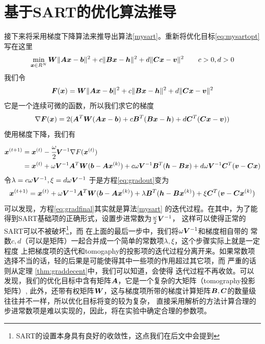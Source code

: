 \section{基于SART的优化算法推导}
接下来将采用梯度下降算法来推导出算法\ref{mysart}。重新将优化目标\ref{eq:mysartopt}写在这里
\begin{equation}
\min_{\bm{ x}\in R^N}\bm{W}\lVert\bm{A}\bm{ x}-\bm{b}\rVert^2 +c\lVert\bm{B}\bm{ x}-\bm{h}\rVert^2+d\lVert\bm{C}\bm{ x}-\bm{v}\rVert^2 \qquad c>0,d>0
\end{equation}
我们令
\begin{equation*}
\bm{F}(\bm{ x}) = \bm{W}\lVert\bm{A}\bm{ x}-\bm{b}\rVert^2 +c\lVert\bm{B}\bm{ x}-\bm{h}\rVert^2+d\lVert\bm{C}\bm{ x}-\bm{v}\rVert^2
\end{equation*}
它是一个连续可微的函数，所以我们求它的梯度
\begin{equation*}
\nabla \bm{F}(\bm{ x}) = 2(\bm{A}^T\bm{W}(\bm{A}\bm{ x}-\bm{b})+c\bm{B}^T(\bm{B}\bm{ x}-\bm{h})+d\bm{C}^T(\bm{C}\bm{ x}-\bm{v}))
\end{equation*}
使用梯度下降，我们有
\begin{equation}\label{eq:gradout}
\begin{split}
\bm{ x}^{(t+1)}&=\bm{ x}^{(t)}-\cfrac{\omega}{2}\bm{V}^{-1}\nabla F(\bm{ x}^{(t)})\\
&=\bm{ x}^{(t)} + \omega\bm{V}^{-1}\bm{A}^T\bm{W}(\bm{b}-\bm{A}\bm{ x}^{(k)})
           + c\omega\bm{V}^{-1}\bm{B}^T(\bm{h}-\bm{B}\bm{ x})
           + d\omega\bm{V}^{-1}\bm{C}^T(\bm{v}-\bm{C}\bm{ x})
\end{split}
\end{equation}\label{eq:gradfinal}
令$\lambda = c\omega\bm{V}^{-1},\xi = d\omega\bm{V}^{-1}$
于是方程\eqref{eq:gradout}变为
\begin{equation}\label{eq:gradout2}
\bm{ x}^{(t+1)}= \bm{ x}^{(t)} + \omega\bm{V}^{-1}\bm{A}^T\bm{W}(\bm{b}-\bm{A}\bm{ x}^{(k)})
           + \lambda \bm{B}^T(\bm{h}-\bm{B}\bm{ x}^{(k)})
           + \xi \bm{C}^T(\bm{v}-\bm{C}\bm{ x}^{(k)})
\end{equation}
可以发现，方程\eqref{eq:gradfinal}其实就是算法\ref{mysart}
的迭代过程。在其中，为了能得到SART基础项的正确形式，设置步进常数为$\tfrac{\omega}{2}\bm{V}^{-1}$，
这样可以使得正常的SART可以不被破坏\footnote{SART的设置本身具有良好的收敛性，这点我们在后文中会提到}，而
在上面的最后一步中，我们将$\omega\bm{V}^{-1}$和梯度相自带的
常数$c,d$（可以是矩阵）一起合并成一个简单的常数项$\lambda ,\xi$，这个步骤实际上就是一定程度
上把梯度项的迭代和tomogaphy的投影项的迭代过程分离开来。如果常数项选择不当的话，轻的后果是可能使得其中一些项的作用超过其它项，而
严重的话则从定理
\ref{thm:graddecent}中，我们可以知道，会使得
迭代过程不再收敛。可以发现，我们的优化目标中含有矩阵$\bm{A}$，它是一个复杂的大矩阵（tomography投影矩阵）,
此外，还带有权矩阵$\bm{W}$，这与梯度项所带的梯度计算矩阵$\bm{B},\bm{C}$的数量级往往并不一样，所以优化目标将变的较为复杂，
直接采用解析的方法计算合理的步进常数项是难以实现的，因此，将在实验中确定合理的参数项。

